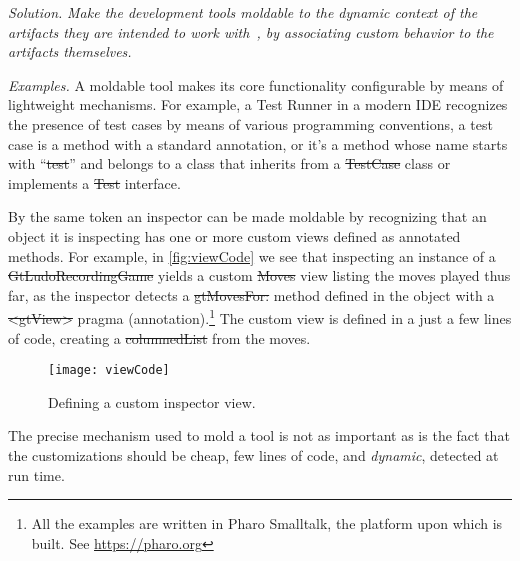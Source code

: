 \documentclass[acmsmall,screen,authorversion,nonacm]{acmart} %
\newcommand\cp[1]{\nbe{Cesare}{#1}{olive}} %
\newcommand\ws[1]{\nbe{Workshop}{#1}{teal}} %
\newcommand{\GT}{\lst{GT}\xspace} %
\newcommand{\patsec}[1]{\noindent\textit{#1.}\xspace}
\begin{document}
\patsec{Solution}
\emph{Make the development tools \emph{moldable} to the \emph{dynamic context} of the artifacts they are intended to work with~\cite{Chis17a}, by associating custom behavior to the artifacts themselves.}

\patsec{Examples}
A moldable tool makes its core functionality configurable by means of lightweight mechanisms.
For example, a Test Runner in a modern IDE recognizes the presence of test cases by means of various programming conventions, \ie a test case is a method with a standard annotation, or it's a method whose name starts with ``\st{test}'' and belongs to a class that inherits from a \st{TestCase} class or implements a \st{Test} interface.

By the same token an inspector can be made moldable by recognizing that an object it is inspecting has one or more custom views defined as annotated methods.
For example, in \autoref{fig:viewCode} we see that inspecting an instance of a \st{GtLudoRecordingGame} yields a custom \st{Moves} view listing the moves played thus far, as the inspector detects a \st{gtMovesFor:} method defined in the object with a \st{<gtView>} pragma (\ie annotation).\footnote{All the examples are written in Pharo Smalltalk, the platform upon which \GT is built. See \url{https://pharo.org}}
The custom view is defined in a just a few lines of code, creating a \st{columnedList} from the moves.

\begin{figure}[h]
  \texttt{[image: viewCode]}
  \caption{Defining a custom inspector view.}
  \label{fig:viewCode}
\end{figure}

The precise mechanism used to mold a tool is not as important as is the fact that the customizations should be cheap, \ie few lines of code, and \emph{dynamic}, \ie detected at run time.
\end{document}
